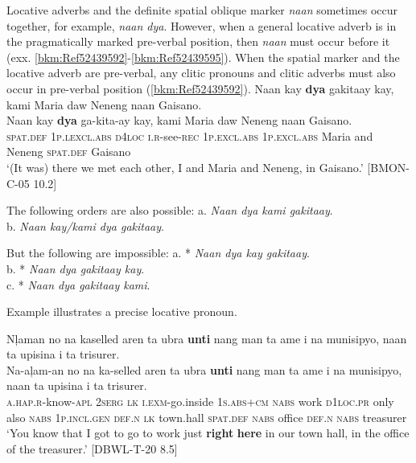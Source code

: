 Locative adverbs and the definite spatial oblique marker \textit{naan} sometimes occur together, for example, \textit{naan dya}. However, when a general locative adverb is in the pragmatically marked pre-verbal position, then \textit{naan} must occur before it (exx. \ref{bkm:Ref52439592}{}-\ref{bkm:Ref52439595}). When the spatial marker and the locative adverb are pre-verbal, any clitic pronouns and clitic adverbs must also occur in pre-verbal position (\ref{bkm:Ref52439592}).
\ea
\label{bkm:Ref52439592}
Naan  kay  \textbf{dya}  gakitaay  kay,  kami Maria  daw  Neneng  naan  Gaisano. \\\smallskip
 \gll Naan  kay  \textbf{dya}  ga-kita-ay  kay,  kami Maria  daw  Neneng  naan  Gaisano. \\
\textsc{spat.def}  1\textsc{p.lexcl.abs}  \textsc{d4loc}  \textsc{i.r}-see-\textsc{rec} 1\textsc{p.excl.abs} 1\textsc{p.excl.abs}
Maria  and  Neneng  \textsc{spat.def}  Gaisano \\
\glt ‘(It was) there we met each other, I and Maria and Neneng, in Gaisano.’ [BMON-C-05 10.2]
\z

The following orders are also possible:
\ea
\label{bkm:Ref52439595}
a. \textit{Naan dya kami gakitaay}. \\
b. \textit{Naan kay/kami dya gakitaay}. \\ 
\z

But the following are impossible:
\ea
a. * \textit{Naan dya kay gakitaay}. \\
b. * \textit{Naan dya gakitaay kay}. \\
c. * \textit{Naan dya gakitaay kami}.
\z

Example  illustrates a precise locative pronoun.

\ea
\label{bkm:Ref52439955}
Nļaman  no  na  kaselled  aren ta  ubra \textbf{unti}  nang  man  ta  ame  i  na  munisipyo, naan  ta  upisina  i  ta  trisurer. \\\smallskip
 \gll Na-aļam-an  no  na  ka-selled  aren ta  ubra \textbf{unti}  nang  man  ta  ame  i  na  munisipyo, naan  ta  upisina  i  ta  trisurer. \\
\textsc{a.hap.r}-know-\textsc{apl}  \textsc{2serg}  \textsc{lk}  \textsc{i.exm}-go.inside  1\textsc{s.abs+cm} \textsc{nabs}  work \textsc{d1loc.pr}  only  also  \textsc{nabs} 1\textsc{p.incl.gen}  \textsc{def.n}  \textsc{lk}  town.hall \textsc{spat.def}  \textsc{nabs}  office  \textsc{def.n}  \textsc{nabs} treasurer \\
\glt `You know that I got to go to work just \textbf{right} \textbf{here} in our town hall, in the office of the treasurer.’ [DBWL-T-20 8.5] 
\z

